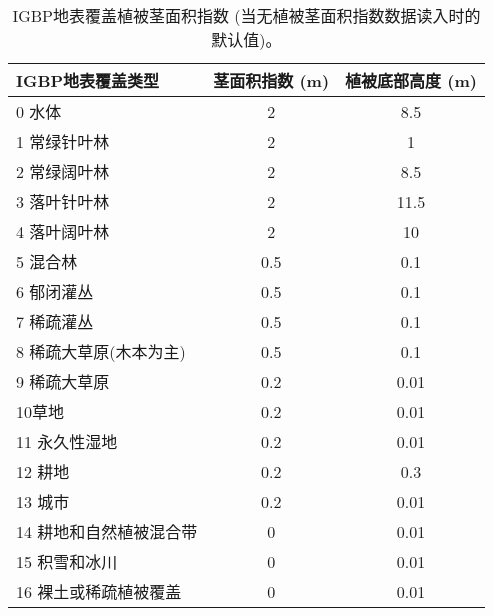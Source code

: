 \begin{table}[]
    \centering
    \caption{IGBP地表覆盖植被茎面积指数 (当无植被茎面积指数数据读入时的默认值)。}
    \label{tab:IGBP地表覆盖植被茎面积指数}
\begin{tabular}{@{}lcc@{}}
\toprule
IGBP地表覆盖类型    & 茎面积指数 (m) & 植被底部高度 (m) \\ \midrule
0 水体          & 2                   & 8.5                 \\
1 常绿针叶林       & 2                   & 1                   \\
2 常绿阔叶林       & 2                   & 8.5                 \\
3 落叶针叶林       & 2                   & 11.5                \\
4 落叶阔叶林       & 2                   & 10                  \\
5 混合林         & 0.5                 & 0.1                 \\
6 郁闭灌丛        & 0.5                 & 0.1                 \\
7 稀疏灌丛        & 0.5                 & 0.1                 \\
8 稀疏大草原(木本为主) & 0.5                 & 0.1                 \\
9 稀疏大草原       & 0.2                 & 0.01                \\
10草地          & 0.2                 & 0.01                \\
11 永久性湿地      & 0.2                 & 0.01                \\
12 耕地         & 0.2                 & 0.3                 \\
13 城市         & 0.2                 & 0.01                \\
14 耕地和自然植被混合带 & 0                   & 0.01                \\
15 积雪和冰川      & 0                   & 0.01                \\
16 裸土或稀疏植被覆盖  & 0                   & 0.01                \\ \bottomrule
\end{tabular}
\end{table}


